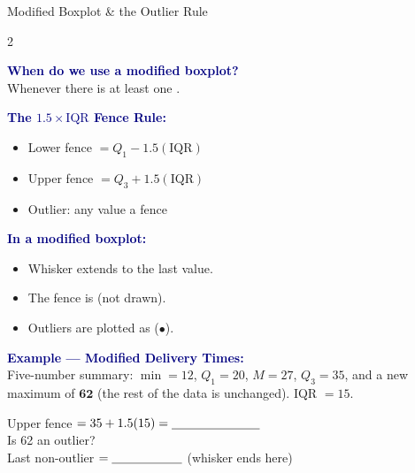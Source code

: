 \documentclass[10pt]{article}
\begin{document}
\vspace{0.08in}

\begin{notesbox}{Modified Boxplot \& the Outlier Rule}
\small
\begin{multicols}{2}

\textbf{\textcolor{navy}{When do we use a modified boxplot?}}\\
Whenever there is at least one \blank{3cm}.

\vspace{6pt}
\textbf{\textcolor{navy}{The $1.5 \times \text{IQR}$ Fence Rule:}}
\begin{itemize}[itemsep=4pt]
  \item Lower fence $= Q_1 - 1.5(\text{IQR})$
  \item Upper fence $= Q_3 + 1.5(\text{IQR})$
  \item Outlier: any value \blank{3cm} a fence
\end{itemize}

\vspace{6pt}
\textbf{\textcolor{navy}{In a modified boxplot:}}
\begin{itemize}[itemsep=3pt]
  \item Whisker extends to the last \blank{2.5cm} value.
  \item The fence is \blank{2.5cm} (not drawn).
  \item Outliers are plotted as \blank{2cm} ($\bullet$).
\end{itemize}

\columnbreak

\textbf{\textcolor{navy}{Example --- Modified Delivery Times:}}\\[4pt]
Five-number summary: $\min=12$, $Q_1=20$, $M=27$, $Q_3=35$, and a
new maximum of $\mathbf{62}$ (the rest of the data is unchanged).
IQR $= 15$.

\vspace{4pt}
Upper fence $= 35 + 1.5(15) = \blank{2.5cm}$\\[3pt]
Is 62 an outlier? \blank{2cm}\\[3pt]
Last non-outlier $= \blank{2cm}$ (whisker ends here)


\end{multicols}
\end{notesbox}
\end{document}
